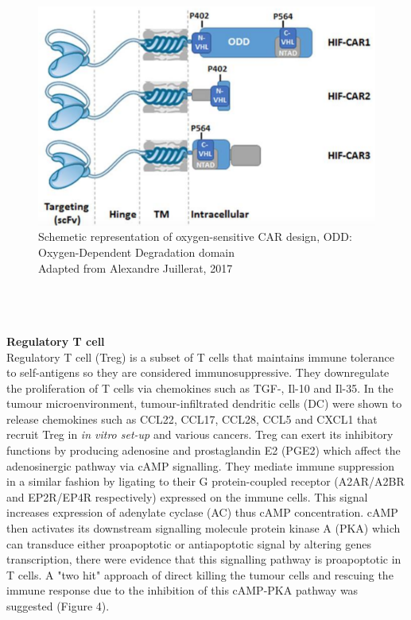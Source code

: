 \documentclass[12pt,oneside]{report}
\begin{document}
\begin{figure}[h!]
  \includegraphics[scale=0.35]{HIF-CAR.png}
  \caption{Schemetic representation of oxygen-sensitive CAR design, ODD: Oxygen-Dependent Degradation domain \\
   Adapted from Alexandre Juillerat, 2017\citep{hypoxia-8}}
\end{figure} \\\\\\
\textbf{Regulatory T cell} \\
Regulatory T cell (Treg) is a subset of T cells that maintains immune tolerance to self-antigens so they are considered immunosuppressive. They downregulate the proliferation of T cells via chemokines such as TGF-\textbeta, Il-10 and Il-35\citep{Treg}. In the tumour microenvironment, tumour-infiltrated dendritic cells (DC) were shown to release chemokines such as CCL22\citep{Treg-2, Treg-3}, CCL17\citep{Treg-2}, CCL28\citep{Treg-4}, CCL5\citep{Treg-5} and CXCL1\citep{Treg-6} that recruit Treg in \textit{in vitro set-up\citep{Treg-2, Treg-3, Treg-4}} and various cancers\citep{Treg-3, Treg-4, Treg-5, Treg-6}. Treg can exert its inhibitory functions by producing adenosine and prostaglandin E2 (PGE2) which affect the adenosinergic pathway via cAMP signalling\citep{Treg-7, Treg-8}. They mediate immune suppression in a similar fashion by ligating to their G protein-coupled receptor (A2AR/A2BR and EP2R/EP4R respectively) expressed on the immune cells\citep{Treg-7, Treg-8}. This signal increases expression of adenylate cyclase (AC) thus cAMP concentration. cAMP then activates its downstream signalling molecule protein kinase A (PKA) which can transduce either proapoptotic or antiapoptotic signal by altering genes transcription\citep{cAMP}, there were evidence that this signalling pathway is proapoptotic in T cells\citep{cAMP-2, cAMP-3, cAMP-4}. A "two hit" approach of direct killing the tumour cells and rescuing the immune response due to the inhibition of this cAMP-PKA pathway was suggested\citep{cAMP-5} (Figure 4). \\
\end{document}
